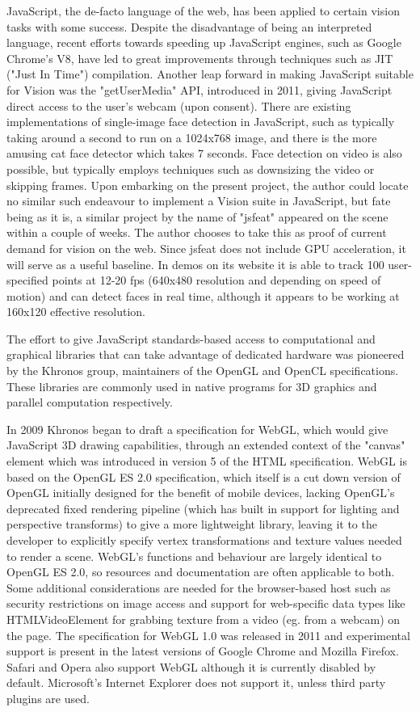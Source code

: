 \documentclass[a4paper]{article}
\begin{document}
JavaScript, the de-facto language of the web, has been applied to certain vision tasks with some success. Despite the disadvantage of being an interpreted language, recent efforts towards speeding up JavaScript engines, such as Google Chrome's V8, have led to great improvements through techniques such as JIT ("Just In Time") compilation. Another leap forward in making JavaScript suitable for Vision was the "getUserMedia" API, introduced in 2011, giving JavaScript direct access to the user's webcam (upon consent). There are existing implementations of single-image face detection in JavaScript, such as \cite{NSS} typically taking around a second to run on a 1024x768 image, and there is the more amusing cat face detector \cite{Kittydar} which takes 7 seconds. Face detection on video is also possible, but typically employs techniques such as downsizing the video or skipping frames. Upon embarking on the present project, the author could locate no similar such endeavour to implement a Vision suite in JavaScript, but fate being as it is, a similar project by the name of "jsfeat" \cite{jsfeat} appeared on the scene within a couple of weeks. The author chooses to take this as proof of current demand for vision on the web. Since jsfeat does not include GPU acceleration, it will serve as a useful baseline. In demos on its website it is able to track 100 user-specified points at 12-20 fps (640x480 resolution and depending on speed of motion) and can detect faces in real time, although it appears to be working at 160x120 effective resolution.

The effort to give JavaScript standards-based access to computational and graphical libraries that can take advantage of dedicated hardware was pioneered by the Khronos group, maintainers of the OpenGL and OpenCL specifications. These libraries are commonly used in native programs for 3D graphics and parallel computation respectively.

In 2009 Khronos began to draft a specification for WebGL, which would give JavaScript 3D drawing capabilities, through an extended context of the "canvas" element which was introduced in version 5 of the HTML specification. WebGL is based on the OpenGL ES 2.0 specification, which itself is a cut down version of OpenGL initially designed for the benefit of mobile devices, lacking OpenGL's deprecated fixed rendering pipeline (which has built in support for lighting and perspective transforms) to give a more lightweight library, leaving it to the developer to explicitly specify vertex transformations and texture values needed to render a scene. WebGL's functions and behaviour are largely identical to OpenGL ES 2.0, so resources and documentation are often applicable to both. Some additional considerations are needed for the browser-based host such as security restrictions on image access and support for web-specific data types like HTMLVideoElement for grabbing texture from a video (eg. from a webcam) on the page. The specification for WebGL 1.0 was released in 2011 and experimental support is present in the latest versions of Google Chrome and Mozilla Firefox. Safari and Opera also support WebGL although it is currently disabled by default. Microsoft's Internet Explorer does not support it, unless third party plugins are used.
\end{document}
